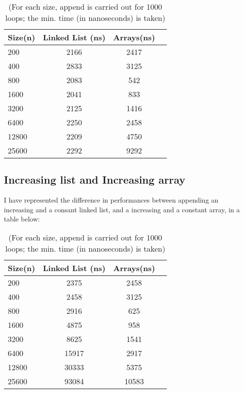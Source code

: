 \documentclass[a4paper,11pt]{article}
\begin{document}
\begin{table}[h]
\begin{center}
\begin{tabular}{l|c|c|c}
\textbf{Size(n)} & \textbf{Linked List (ns)} & \textbf{Arrays(ns)}\\
\hline
  200      &  2166 &     2417\\
  400      &  2833 &     3125\\
  800      &  2083 &     542\\
  1600      &  2041 &     833\\
  3200      &  2125 &     1416\\
  6400      &  2250 &     2458\\
  12800      &  2209 &     4750\\
  25600      &  2292 &     9292\\
\end{tabular}
\caption{(For each size, append is carried out for 1000 loops; the min. time (in nanoseconds) is taken)}
\label{tab:table1}
\end{center}
\end{table}

\subsection*{Increasing list and Increasing array}

I have represented the difference in performances between appending an increasing and a consant linked list, and a increasing and a constant array, in a table below:

\begin{table}[h]
\begin{center}
\begin{tabular}{l|c|c|c}
\textbf{Size(n)} & \textbf{Linked List (ns)} & \textbf{Arrays(ns)}\\
\hline
  200      &  2375 &     2458\\
  400      &  2458 &     3125\\
  800      &  2916 &     625\\
  1600      &  4875 &     958\\
  3200      &  8625 &     1541\\
  6400      &  15917 &     2917\\
  12800      &  30333 &     5375\\
  25600      &  93084 &     10583\\
\end{tabular}
\caption{(For each size, append is carried out for 1000 loops; the min. time (in nanoseconds) is taken)}
\label{tab:table1}
\end{center}
\end{table}
\end{document}
